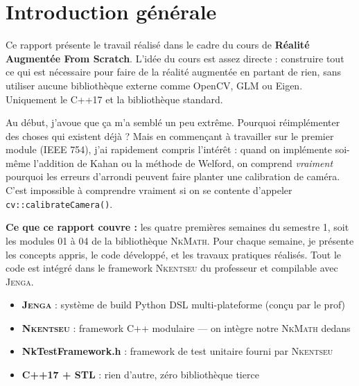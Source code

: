 \documentclass[12pt,a4paper]{report}
\newcommand{\code}[1]{\texttt{\textcolor{myblue}{#1}}}
\newcommand{\nkmath}{\textsc{NkMath}}
\newcommand{\nkentseu}{\textsc{Nkentseu}}
\newcommand{\jenga}{\textsc{Jenga}}
\begin{document}
\tableofcontents
\newpage

\chapter*{Introduction générale}

Ce rapport présente le travail réalisé dans le cadre du cours de \textbf{Réalité Augmentée From Scratch}. L'idée du cours est assez directe : construire tout ce qui est nécessaire pour faire de la réalité augmentée en partant de rien, sans utiliser aucune bibliothèque externe comme OpenCV, GLM ou Eigen. Uniquement le C++17 et la bibliothèque standard.

Au début, j'avoue que ça m'a semblé un peu extrême. Pourquoi réimplémenter des choses qui existent déjà ? Mais en commençant à travailler sur le premier module (IEEE 754), j'ai rapidement compris l'intérêt : quand on implémente soi-même l'addition de Kahan ou la méthode de Welford, on comprend \textit{vraiment} pourquoi les erreurs d'arrondi peuvent faire planter une calibration de caméra. C'est impossible à comprendre vraiment si on se contente d'appeler \code{cv::calibrateCamera()}.

\medskip

\noindent\textbf{Ce que ce rapport couvre :} les quatre premières semaines du semestre 1, soit les modules 01 à 04 de la bibliothèque \nkmath{}. Pour chaque semaine, je présente les concepts appris, le code développé, et les travaux pratiques réalisés. Tout le code est intégré dans le framework \nkentseu{} du professeur et compilable avec \jenga{}.

\medskip

\begin{infobox}
\begin{itemize}
    \item \textbf{\jenga{}} : système de build Python DSL multi-plateforme (conçu par le prof)
    \item \textbf{\nkentseu{}} : framework C++ modulaire — on intègre notre \nkmath{} dedans
    \item \textbf{NkTestFramework.h} : framework de test unitaire fourni par \nkentseu{}
    \item \textbf{C++17 + STL} : rien d'autre, zéro bibliothèque tierce
\end{itemize}
\end{infobox}
\end{document}
